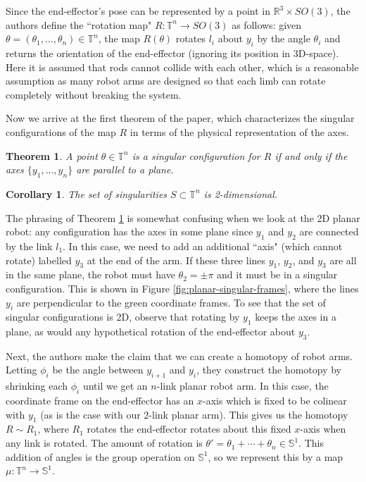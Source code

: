 \documentclass[12pt]{article}
\newtheorem{thm}{Theorem}
\newtheorem*{cor}{Corollary}
\theoremstyle{definition}
\begin{document}
Since the end-effector's pose can be represented by a point in
\(\mathbb{R}^3\times SO(3)\), the authors define the ``rotation map" 
\(R : \mathbb{T}^n \rightarrow SO(3)\) as follows: 
given \(\theta = (\theta_1,\ldots,\theta_n) \in \mathbb{T}^n\),
the map \(R(\theta)\) rotates \(l_i\) about \(y_i\) by the angle \(\theta_i\)
and returns the orientation of the end-effector (ignoring its position in
3D-space). Here it is assumed that rods cannot collide with each other, which
is a reasonable assumption as many robot arms are designed so that each limb can
rotate completely without breaking the system.

Now we arrive at the first theorem of the paper, which characterizes the singular
configurations of the map \(R\) in terms of the physical representation of the
axes.

\begin{thm}\label{thm:singular-plane}
    A point \(\theta \in \mathbb{T}^n\) is a singular configuration for \(R\) if
    and only if the axes \(\{y_1,\ldots,y_n\}\) are parallel to a plane.
\end{thm}
\begin{cor}
    The set of singularities \(S \subset \mathbb{T}^n\) is 2-dimensional.
\end{cor}

The phrasing of Theorem \ref{thm:singular-plane} is somewhat confusing when we
look at the 2D planar robot: any configuration has the axes in some plane since \(y_1\) and
\(y_2\) are connected by the link \(l_1\). 
In this case, we need to add an additional ``axis" (which cannot rotate) labelled
\(y_3\) at the end of the arm. If these three lines \(y_1\), \(y_2\), and \(y_3\)
are all in the same plane, the robot must have \(\theta_2 = \pm \pi\) and it
must be in a singular configuration. This is shown in Figure
\ref{fig:planar-singular-frames}, where the lines \(y_i\) are perpendicular to the
green coordinate frames.
To see that the set of singular configurations is 2D, observe that rotating by
\(y_1\) keeps the axes in a plane, as would any hypothetical rotation of the
end-effector about \(y_3\).

Next, the authors make the claim that we can create a homotopy of robot arms.
Letting \(\phi_i\) be the angle between \(y_{i+1}\) and \(y_i\), they construct
the homotopy by shrinking each \(\phi_i\) until we get an \(n\)-link planar
robot arm. In this case, the coordinate frame on the end-effector has an 
\(x\)-axis which is fixed to be colinear with \(y_1\) (as is the case with our
2-link planar arm). This gives us the homotopy \(R \sim R_1\), where \(R_1\)
rotates the end-effector rotates about this fixed \(x\)-axis when any link
is rotated. The amount of rotation is 
\(\theta' = \theta_1 + \cdots + \theta_n \in \mathbb{S}^1\). This addition of
angles is the group operation on \(\mathbb{S}^1\), so we represent this by a map
\(\mu : \mathbb{T}^n \rightarrow \mathbb{S}^1\). 
\end{document}
